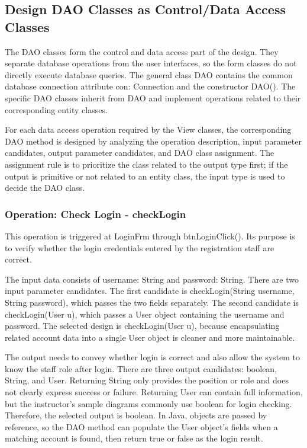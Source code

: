 \subsection{Design DAO Classes as Control/Data Access Classes}

The DAO classes form the control and data access part of the design. They separate database operations from the user interfaces, so the form classes do not directly execute database queries. The general class DAO contains the common database connection attribute con: Connection and the constructor DAO(). The specific DAO classes inherit from DAO and implement operations related to their corresponding entity classes.

For each data access operation required by the View classes, the corresponding DAO method is designed by analyzing the operation description, input parameter candidates, output parameter candidates, and DAO class assignment. The assignment rule is to prioritize the class related to the output type first; if the output is primitive or not related to an entity class, the input type is used to decide the DAO class.

\subsubsection{Operation: Check Login - checkLogin}

This operation is triggered at LoginFrm through btnLoginClick(). Its purpose is to verify whether the login credentials entered by the registration staff are correct.

The input data consists of username: String and password: String. There are two input parameter candidates. The first candidate is checkLogin(String username, String password), which passes the two fields separately. The second candidate is checkLogin(User u), which passes a User object containing the username and password. The selected design is checkLogin(User u), because encapsulating related account data into a single User object is cleaner and more maintainable.

The output needs to convey whether login is correct and also allow the system to know the staff role after login. There are three output candidates: boolean, String, and User. Returning String only provides the position or role and does not clearly express success or failure. Returning User can contain full information, but the instructor's sample diagrams commonly use boolean for login checking. Therefore, the selected output is boolean. In Java, objects are passed by reference, so the DAO method can populate the User object's fields when a matching account is found, then return true or false as the login result.

